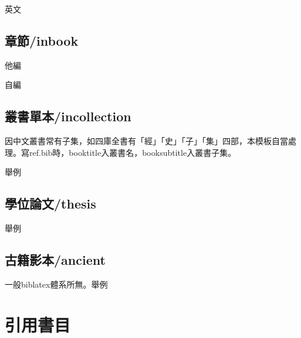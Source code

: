 英文

\subsection*{章節/inbook}
他編

自編

\subsection*{叢書單本/incollection}
因中文叢書常有子集，如四庫全書有「經」「史」「子」「集」四部，本模板自當處理。寫ref.bib時，booktitle入叢書名，booksubtitle入叢書子集。

舉例

\subsection*{學位論文/thesis}
舉例

\subsection*{古籍影本/ancient}
一般biblatex體系所無。舉例

\section*{引用書目}

\ttfamily\selectfont
\begin{refcontext}[sorting = centy]
\printbibliography[filter = {hsource}, title = {\large 一、史料文獻}]
\end{refcontext}
\begin{refcontext}[sorting = centy]
\printbibliography[filter = {nothsource}, title = {\large 二、近人研究}]
\end{refcontext}


